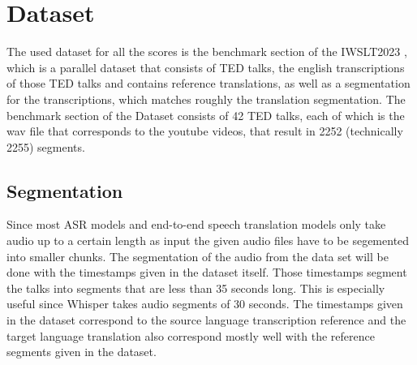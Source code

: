 \section{Dataset}
\label{ch:Dataset}
The used dataset for all the scores is the benchmark section of the IWSLT2023 \cite{sperber2024evaluating}, which is a parallel dataset that consists of TED talks, the english transcriptions of those TED talks and contains reference translations, as well as a segmentation for the transcriptions, which matches roughly the translation segmentation. 
The benchmark section of the Dataset consists of 42 TED talks, each of which is the wav file that corresponds to the youtube videos, that result in 2252 (technically 2255)  segments. 
\subsection{Segmentation}
\label{sec:FirstContent:Segmentation}
Since most ASR models and end-to-end speech translation models only take audio up to a certain length as input the given audio files have to be segemented into smaller chunks. 
The segmentation of the audio from the data set will be done with the timestamps given in the dataset itself. 
Those timestamps segment the talks into segments that are less than 35 seconds long. This is especially useful since Whisper takes audio segments of 30 seconds. 
The timestamps given in the dataset correspond to the source language transcription reference and the target language translation also correspond mostly well with the reference segments given in the dataset. 
